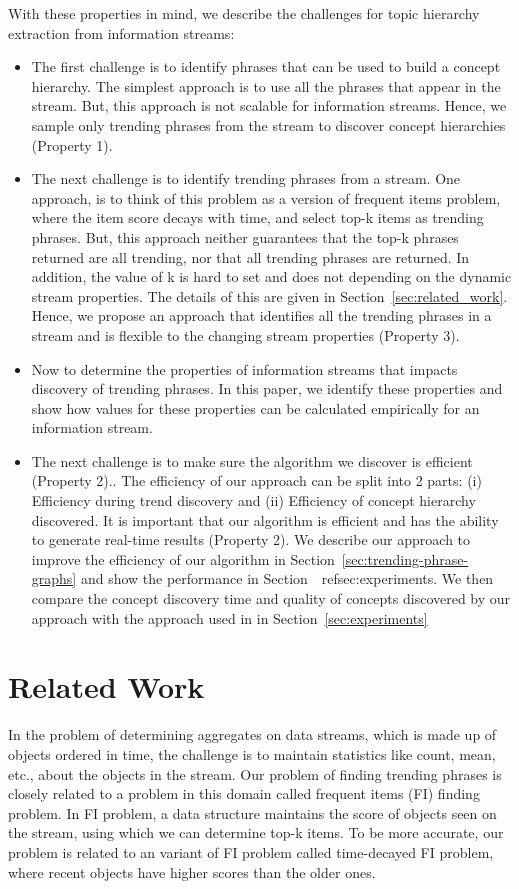 \documentclass{sig-alternate}
\begin{document}
\medskip With these properties in mind, we describe the challenges for topic hierarchy extraction from information streams: 
\begin{itemize}
\item The first challenge is to identify phrases that can be used to build a concept hierarchy. The simplest approach is to use all the phrases that appear in the stream. But, this approach is not scalable for information streams. Hence, we sample only trending phrases from the stream to discover concept hierarchies (Property 1). 
\item The next challenge is to identify trending phrases from a stream.  One approach, is to think of this problem as a version of frequent items problem, where the item score decays with time, and select top-k items as trending phrases. But, this approach neither guarantees that the top-k phrases returned are all trending, nor that all trending phrases are returned. In addition, the value of k is hard to set and does not depending on the dynamic stream properties. The details of this are given in Section~\ref{sec:related_work}. Hence, we propose an approach that identifies all the trending phrases in a stream and is flexible to the changing stream properties (Property 3).
\item Now to determine the properties of information streams that impacts discovery of trending phrases. In this paper, we identify these properties and show how values for these properties can be calculated empirically for an information stream.
\item The next challenge is to make sure the algorithm we discover is efficient  (Property 2).. The efficiency of our approach can be split into 2 parts: (i) Efficiency during trend discovery and (ii) Efficiency of concept hierarchy discovered. It is important that our algorithm is efficient and has the ability to generate real-time results (Property 2). We describe our approach to improve the efficiency of our algorithm in Section~\ref{sec:trending-phrase-graphs} and show the performance in Section~\ ref{sec:experiments}. We then compare the concept discovery time and quality of concepts discovered by our approach with the approach used in \cite{Sanderson:1999:derivingconcept} in Section~\ref{sec:experiments}
\end{itemize}

\section{Related Work}
In the problem of determining aggregates on data streams, which is made up of objects ordered in time, the challenge is to maintain statistics like count, mean, etc., about the objects in the stream. Our problem of finding trending phrases is closely related to a problem in this domain called frequent items (FI) finding problem. In FI problem, a data structure maintains the score of objects seen on the stream, using which we can determine top-k items. To be more accurate, our problem is related to an variant of FI problem called time-decayed FI problem, where recent objects have higher scores than the older ones. 
\end{document}
